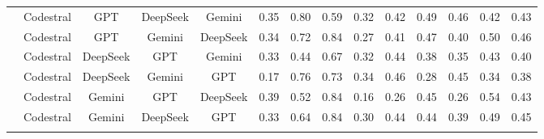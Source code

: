 \documentclass[authoryear,final,5p,times,twocolumn]{elsarticle}
\theoremstyle{plain}
\begin{document}
\begin{table}[p]
{\begin{tabular}{
>{\centering\arraybackslash}l
*{13}{>{\centering\arraybackslash}c}
}
& Codestral & GPT & DeepSeek & Gemini & \cellcolor{orange!19}0.35 & \cellcolor{green!13}0.80 & \cellcolor{red!15}0.59 & \cellcolor{orange!12}0.32 & \cellcolor{green!11}0.42 & \cellcolor{green!13}0.49 & \cellcolor{green!12}0.46 & \cellcolor{red!11}0.42 & \cellcolor{orange!17}0.43 \\
& Codestral & GPT & Gemini & DeepSeek & \cellcolor{orange!19}0.34 & \cellcolor{green!10}0.72 & \cellcolor{green!14}0.84 & \cellcolor{orange!15}0.27 & \cellcolor{green!11}0.41 & \cellcolor{green!12}0.47 & \cellcolor{orange!11}0.40 & \cellcolor{orange!16}0.50 & \cellcolor{orange!14}0.46 \\
& Codestral & DeepSeek & GPT & Gemini & \cellcolor{orange!19}0.33 & \cellcolor{orange!18}0.44 & \cellcolor{orange!18}0.67 & \cellcolor{orange!12}0.32 & \cellcolor{green!12}0.44 & \cellcolor{orange!14}0.38 & \cellcolor{orange!14}0.35 & \cellcolor{red!10}0.43 & \cellcolor{red!10}0.40 \\
& Codestral & DeepSeek & Gemini & GPT & \cellcolor{red!16}0.17 & \cellcolor{green!11}0.76 & \cellcolor{orange!14}0.73 & \cellcolor{orange!10}0.34 & \cellcolor{green!14}0.46 & \cellcolor{red!11}0.28 & \cellcolor{green!11}0.45 & \cellcolor{red!15}0.34 & \cellcolor{red!12}0.38 \\
& Codestral & Gemini & GPT & DeepSeek & \cellcolor{orange!17}0.39 & \cellcolor{orange!16}0.52 & \cellcolor{green!14}0.84 & \cellcolor{red!12}0.16 & \cellcolor{orange!18}0.26 & \cellcolor{green!10}0.45 & \cellcolor{red!10}0.26 & \cellcolor{orange!14}0.54 & \cellcolor{orange!17}0.43 \\
& Codestral & Gemini & DeepSeek & GPT & \cellcolor{orange!19}0.33 & \cellcolor{orange!12}0.64 & \cellcolor{green!14}0.84 & \cellcolor{orange!13}0.30 & \cellcolor{green!12}0.44 & \cellcolor{green!10}0.44 & \cellcolor{orange!12}0.39 & \cellcolor{orange!17}0.49 & \cellcolor{orange!15}0.45 \\
\addlinespace[1.5ex]


\end{tabular}}
\end{table}
\end{document}
